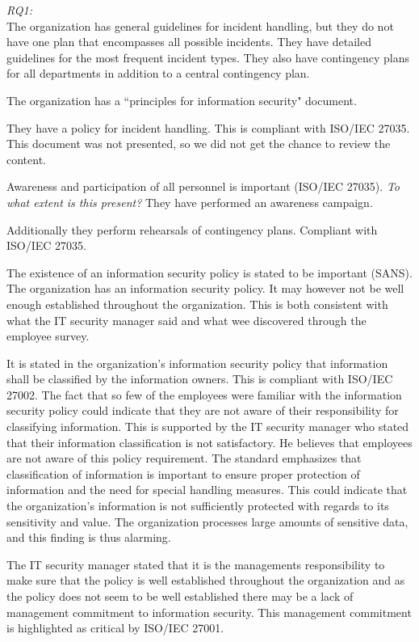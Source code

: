 \textit{RQ1:}\\
The organization has general guidelines for incident handling, but they do not have one plan that encompasses all possible incidents. They have detailed guidelines for the most frequent incident types. They also have contingency plans for all departments in addition to a central contingency plan. 

The organization has a ``principles for information security" document.


They have a policy for incident handling. This is compliant with ISO/IEC 27035. This document was not presented, so we did not get the chance to review the content.

Awareness and participation of all personnel is important (ISO/IEC 27035). \textit{To what extent is this present?} They have performed an awareness campaign. 

Additionally they perform rehearsals of contingency plans. Compliant with ISO/IEC 27035.

The existence of an information security policy is stated to be important (SANS). The organization has an information security policy. It may however not be well enough established throughout the organization. This is both consistent with what the IT security manager said and what wee discovered through the employee survey.

It is stated in the organization's information security policy that information shall be classified by the information owners. This is compliant with ISO/IEC 27002. The fact that so few of the employees were familiar with the information security policy could indicate that they are not aware of their responsibility for classifying information. This is supported by the IT security manager who stated that their information classification is not satisfactory. He believes that employees are not aware of this policy requirement. The standard emphasizes that classification of information is important to ensure proper protection of information and the need for special handling measures. This could indicate that the organization's information is not sufficiently protected with regards to its sensitivity and value. The organization processes large amounts of sensitive data, and this finding is thus alarming.

The IT security manager stated that it is the managements responsibility to make sure that the policy is well established throughout the organization and as the policy does not seem to be well established there may be a lack of management commitment to information security. This management commitment is highlighted as critical by ISO/IEC 27001. 


